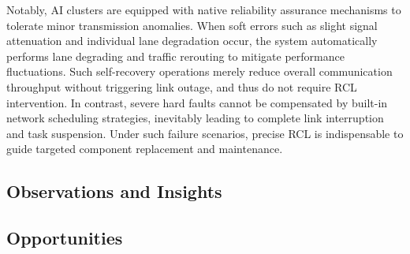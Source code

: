 Notably, AI clusters are equipped with native reliability assurance mechanisms to tolerate minor transmission anomalies. When soft errors such as slight signal attenuation and individual lane degradation occur, the system automatically performs lane degrading and traffic rerouting to mitigate performance fluctuations. Such self-recovery operations merely reduce overall communication throughput without triggering link outage, and thus do not require RCL intervention. In contrast, severe hard faults cannot be compensated by built-in network scheduling strategies, inevitably leading to complete link interruption and task suspension. Under such failure scenarios, precise RCL is indispensable to guide targeted component replacement and maintenance.

\subsection{Observations and Insights} 

\subsection{Opportunities}